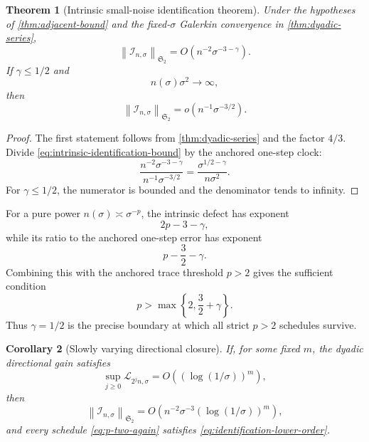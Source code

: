 \documentclass[11pt]{article}
\newtheorem{theorem}{Theorem}[section]
\newtheorem{corollary}[theorem]{Corollary}
\theoremstyle{definition}
\theoremstyle{remark}
\newcommand{\cI}{\mathcal I}
\newcommand{\cL}{\mathcal L}
\newcommand{\HS}{\mathfrak S_2}
\newcommand{\norm}[1]{\left\lVert #1\right\rVert}
\begin{document}
\begin{theorem}[Intrinsic small-noise identification theorem]
\label{thm:intrinsic-identification}
Under the hypotheses of \cref{thm:adjacent-bound} and the fixed-$\sigma$
Galerkin convergence in \cref{thm:dyadic-series},
\begin{equation}
 \boxed{
 \norm{\cI_{n,\sigma}}_{\HS}
 =O(n^{-2}\sigma^{-3-\gamma}).}
 \label{eq:intrinsic-identification-bound}
\end{equation}
If $\gamma\le1/2$ and
\begin{equation}
 n(\sigma)\sigma^2\longrightarrow\infty,
 \label{eq:p-two-again}
\end{equation}
then
\begin{equation}
 \norm{\cI_{n,\sigma}}_{\HS}
 =o(n^{-1}\sigma^{-3/2}).
 \label{eq:identification-lower-order}
\end{equation}
\end{theorem}

\begin{proof}
The first statement follows from \cref{thm:dyadic-series} and the factor
$4/3$.  Divide \eqref{eq:intrinsic-identification-bound} by the anchored
one-step clock:
\begin{equation}
 \frac{n^{-2}\sigma^{-3-\gamma}}
 {n^{-1}\sigma^{-3/2}}
 =\frac{\sigma^{1/2-\gamma}}{n\sigma^2}.
 \label{eq:relative-clock}
\end{equation}
For $\gamma\le1/2$, the numerator is bounded and the denominator tends to
infinity.
\end{proof}

For a pure power $n(\sigma)\asymp\sigma^{-p}$, the intrinsic defect has
exponent
\begin{equation}
 2p-3-\gamma,
 \label{eq:identification-power}
\end{equation}
while its ratio to the anchored one-step error has exponent
\begin{equation}
 p-\frac32-\gamma.
 \label{eq:relative-power}
\end{equation}
Combining this with the anchored trace threshold $p>2$ gives the sufficient
condition
\begin{equation}
 p>\max\!\left\{2,\frac32+\gamma\right\}.
 \label{eq:general-p-threshold}
\end{equation}
Thus $\gamma=1/2$ is the precise boundary at which all strict $p>2$
schedules survive.

\begin{corollary}[Slowly varying directional closure]
\label{cor:polylog-closure}
If, for some fixed $m$, the dyadic directional gain satisfies
\begin{equation}
 \sup_{j\ge0}\cL_{2^jn,\sigma}
 =O((\log(1/\sigma))^m),
 \label{eq:polylog-gain}
\end{equation}
then
\begin{equation}
 \norm{\cI_{n,\sigma}}_{\HS}
 =O\!\left(
 n^{-2}\sigma^{-3}(\log(1/\sigma))^m
 \right),
 \label{eq:polylog-identification}
\end{equation}
and every schedule \eqref{eq:p-two-again} satisfies
\eqref{eq:identification-lower-order}.
\end{corollary}
\end{document}
